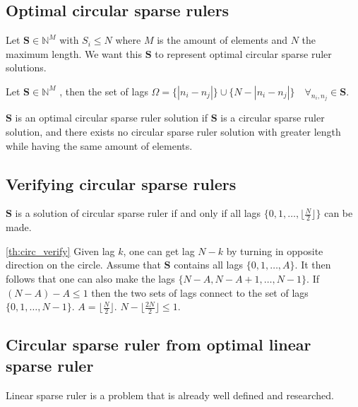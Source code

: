 \documentclass[a4paper, openany, oneside]{memoir}
\begin{document}
\subsection{Optimal circular sparse rulers}
Let $\mathbf{S} \in \mathbb{N}^M$ with $S_i \leq N$ where $M$ is the amount of elements and $N$ the maximum length. We want this $\mathbf{S}$ to represent optimal circular sparse ruler solutions.

\begin{blockDefinition}
    Let $\mathbf{S} \in \mathbb{N}^M$ , then the set of lags $\Omega = \{|n_i-n_j|\} \cup \{N-|n_i-n_j|\} \quad \forall_{n_i,n_j}\in \mathbf{S}$.
\end{blockDefinition}
    

\begin{blockDefinition}
    $\mathbf{S}$ is an optimal circular sparse ruler solution if $\mathbf{S}$ is a circular sparse ruler solution, and there exists no circular sparse ruler solution with greater length while having the same amount of elements.
\end{blockDefinition}

\subsection{Verifying circular sparse rulers}

\begin{blockTheorem} \label{th:circ_verify}\nolinebreak
    $\mathbf{S}$ is a solution of circular sparse ruler if and only if all lags $\{0,1,\dots, \lfloor\frac{N}{2}\rfloor\}$ can be made. \nolinebreak
\end{blockTheorem}

\begin{blockProofTheorem}{\ref{th:circ_verify}}
    Given lag $k$, one can get lag $N-k$ by turning in opposite direction on the circle. Assume that $\mathbf{S}$ contains all lags $\{0,1,\dots, A\}$. It then follows that one can also make the lags  $\{N-A,N-A+1,\dots, N-1\}$. If $(N-A)-A \leq 1$ then the two sets of lags connect to the set of lags $\{0,1,\dots,N-1\}$. $A=\lfloor\frac{N}{2}\rfloor$. $N-\lfloor\frac{2N}{2}\rfloor \leq 1$.
\end{blockProofTheorem}

\subsection{Circular sparse ruler from optimal linear sparse ruler}\label{ssec:minimal_linear_s}
Linear sparse ruler is a problem that is already well defined and researched. 
\end{document}
